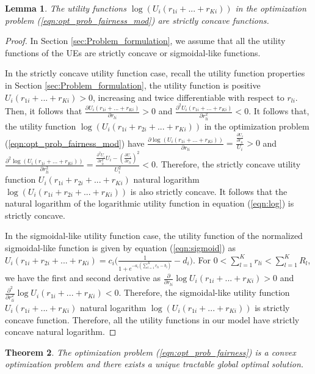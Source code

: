 \documentclass[conference]{IEEEtran}
\newtheorem{thm}{Theorem}[section]
\newtheorem{lem}[thm]{Lemma}
\begin{document}
\begin{lem}\label{lem:concavity}
The utility functions $\log(U_i(r_{1i} + ... + r_{Ki}))$ in the optimization problem (\ref{eqn:opt_prob_fairness_mod}) are strictly concave functions. 
\end{lem}
\begin{proof}
In Section \ref{sec:Problem_formulation}, we assume that all the utility functions of the UEs are strictly concave or sigmoidal-like functions. 

In the strictly concave utility function case, recall the utility function properties in Section \ref{sec:Problem_formulation}, the utility function is positive $ U_i(r_{1i} + ... + r_{Ki}) > 0$, increasing and twice differentiable with respect to $r_{li}$. Then, it follows that $\frac{ \partial U_i(r_{1i} + ... + r_{Ki})}{\partial r_{li}} > 0$ and $\frac{\partial^2 U_i(r_{1i}+ ... + r_{Ki})}{\partial r_{li}^2} < 0$. It follows that, the utility function $\log(U_i(r_{1i} + r_{2i} + ... + r_{Ki}))$ in the optimization problem (\ref{eqn:opt_prob_fairness_mod}) have $\frac{\partial \log(U_i(r_{1i} + ... + r_{Ki}))}{\partial r_{li}} =  \frac{\frac{\partial U_i}{\partial r_{li}}}{U_i} > 0$ and $\frac{\partial ^2\log(U_i(r_{1i} + ... + r_{Ki}))}{\partial r_{li}^2} =  \frac{\frac{\partial^2 U_i}{\partial r_{li}^2}U_i-(\frac{\partial U_i}{\partial r_{li}})^2}{U^2_i} < 0$. Therefore, the strictly concave utility function $U_i(r_{1i} + r_{2i} + ... + r_{Ki})$ natural logarithm  $\log(U_i(r_{1i} + r_{2i} + ... + r_{Ki})
)$ is also strictly concave. It follows that the natural logarithm  of the logarithmic utility function in equation (\ref{eqn:log}) is strictly concave.

In the sigmoidal-like utility function case, the utility function of the normalized sigmoidal-like function is given by equation (\ref{eqn:sigmoid}) as $U_i(r_{1i} + r_{2i} + ... + r_{Ki}) = c_i\Big(\frac{1}{1+e^{-a_i(\sum_{l=1}^{K}r_{li}-b_i)}}-d_i\Big)$. For $0<\sum_{l=1}^{K}r_{li}<\sum_{l=1}^{K}R_l$, we have the first and second derivative as $\frac{\partial}{ \partial r_{li}}\log U_i(r_{1i} + ... + r_{Ki})  >0$ and $\frac{\partial^2}{\partial r_{li}^2}\log U_i(r_{1i} + ... + r_{Ki})  < 0$. Therefore, the sigmoidal-like utility function $U_i(r_{1i}+...+r_{Ki})$ natural logarithm  $\log(U_i(r_{1i}+...+r_{Ki}))$ is strictly concave function. Therefore, all the utility functions in our model have strictly concave natural logarithm.
\end{proof}
\begin{thm}\label{thm:global_soln}
The optimization problem (\ref{eqn:opt_prob_fairness}) is a convex optimization problem and there exists a unique tractable global optimal solution. 
\end{thm}
\end{document}
